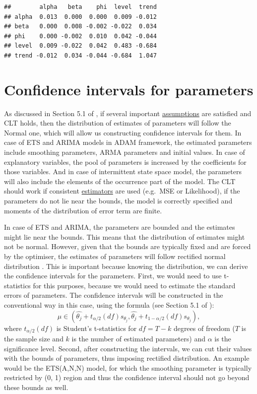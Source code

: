 \documentclass[
]{book}
\theoremstyle{definition}
\theoremstyle{definition}
\theoremstyle{definition}
\theoremstyle{definition}
\theoremstyle{remark}
\begin{document}
\begin{verbatim}
##        alpha   beta    phi  level  trend
## alpha  0.013  0.000  0.000  0.009 -0.012
## beta   0.000  0.008 -0.002 -0.022  0.034
## phi    0.000 -0.002  0.010  0.042 -0.044
## level  0.009 -0.022  0.042  0.483 -0.684
## trend -0.012  0.034 -0.044 -0.684  1.047
\end{verbatim}

\hypertarget{confidence-intervals-for-parameters}{%
\section{Confidence intervals for parameters}\label{confidence-intervals-for-parameters}}

As discussed in Section 5.1 of \citet{SvetunkovSBA}, if several important \protect\hyperlink{diagnostics}{assumptions} are satisfied and CLT holds, then the distribution of estimates of parameters will follow the Normal one, which will allow us constructing confidence intervals for them. In case of ETS and ARIMA models in ADAM framework, the estimated parameters include smoothing parameters, ARMA parameters and initial values. In case of explanatory variables, the pool of parameters is increased by the coefficients for those variables. And in case of intermittent state space model, the parameters will also include the elements of the occurrence part of the model. The CLT should work if consistent \protect\hyperlink{ADAMETSEstimation}{estimators} are used (e.g.~MSE or Likelihood), if the parameters do not lie near the bounds, the model is correctly specified and moments of the distribution of error term are finite.

In case of ETS and ARIMA, the parameters are bounded and the estimates might lie near the bounds. This means that the distribution of estimates might not be normal. However, given that the bounds are typically fixed and are forced by the optimiser, the estimates of parameters will follow rectified normal distribution \citep{WikipediaRectifiedNormal}. This is important because knowing the distribution, we can derive the confidence intervals for the parameters. First, we would need to use t-statistics for this purposes, because we would need to estimate the standard errors of parameters. The confidence intervals will be constructed in the conventional way in this case, using the formula (see Section 5.1 of \citet{SvetunkovSBA}):
\begin{equation}
    \mu \in (\hat{\theta_j} + t_{\alpha/2}(df) s_{\theta_j}, \hat{\theta_j} + t_{1-\alpha/2}(df) s_{\theta_j}), 
    \label{eq:confidenceInterval}
\end{equation}
where \(t_{\alpha/2}(df)\) is Student's t-statistics for \(df=T-k\) degrees of freedom (\(T\) is the sample size and \(k\) is the number of estimated parameters) and \(\alpha\) is the significance level. Second, after constructing the intervals, we can cut their values with the bounds of parameters, thus imposing rectified distribution. An example would be the ETS(A,N,N) model, for which the smoothing parameter is typically restricted by (0, 1) region and thus the confidence interval should not go beyond these bounds as well.
\end{document}
